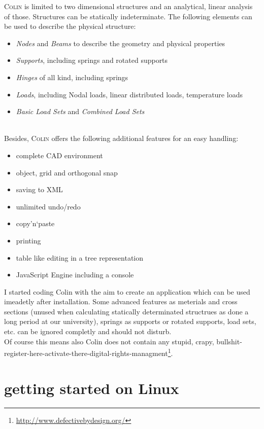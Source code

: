 \documentclass[a4paper,11pt]{report}
\newcommand{\Colin}[0]{\textsc{Colin }}
\begin{document}
\Colin is limited to two dimensional structures and an analytical, linear analysis of those. Structures can be statically indeterminate. The following elements can be used to describe the physical structure:
\begin{itemize}
	\item \textit{Nodes} and \textit{Beams} to describe the geometry and physical properties
	\item \textit{Supports}, including springs and rotated supports
	\item \textit{Hinges} of all kind, including springs
	\item \textit{Loads}, including Nodal loads, linear distributed loads, temperature loads
	\item \textit{Basic Load Sets} and \textit{Combined Load Sets}
\end{itemize}\\
Besides, \Colin offers the following additional features for an easy handling:
\begin{itemize}
	\item complete CAD environment
	\item object, grid and orthogonal snap
	\item saving to XML
	\item unlimited undo/redo
	\item copy'n`paste
	\item printing
	\item table like editing in a tree representation
	\item JavaScript Engine including a console
\end{itemize}

I started coding Colin with the aim to create an application which can be used imeadetly after installation. Some advanced features as meterials and cross sections (unused when calculating statically determinated structrues as done a long period at our university), springs as supports or rotated supports, load sets, etc. can be ignored completly and should not disturb.\\
Of course this means also Colin does not contain any stupid, crapy, bullshit-register-here-activate-there-digital-rights-managment\footnote{\url{http://www.defectivebydesign.org/}}. 

\section{getting started on Linux}
\label{sec:startLinux}
\end{document}
